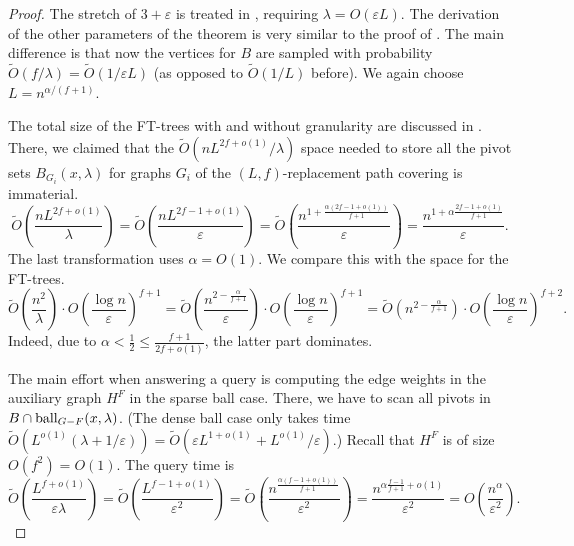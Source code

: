 \documentclass{article}\usepackage[a4paper,margin=20mm]{geometry}
\newcommand*{\Otilde}{\widetilde{O}}
\newcommand*{\ball}{\mbox{\rm ball}}
\renewcommand{\le}{\leqslant}
\begin{document}
\begin{proof}
	The stretch of $3+\varepsilon$ is treated in ,
	requiring $\lambda = O(\varepsilon L)$.
	The derivation of the other parameters of the theorem is very similar to the proof of .
	The main difference is that now the vertices for $B$ are sampled with probability
	$\Otilde(f/\lambda) = \Otilde(1/\varepsilon L)$ (as opposed to $\Otilde(1/L)$ before).
	We again choose $L = n^{\alpha/(f+1)}$.
	
	The total size of the FT-trees with and without granularity
	are discussed in .
	There, we claimed that the $\Otilde(nL^{2f+o(1)}/\lambda)$ space needed
	to store all the pivot sets $B_{G_i}(x,\lambda)$ 
	for graphs $G_i$ of the $(L,f)$-replacement path covering is immaterial.
	\begin{equation*}
		\Otilde\!\left(\frac{nL^{2f+o(1)}}{\lambda}\right) 
			= \Otilde\!\left(\frac{nL^{2f-1+o(1)}}{\varepsilon}\right)
			= \Otilde\left(\frac{n^{1+ \frac{\alpha(2f-1+o(1))}{f+1}}}{\varepsilon}\right)
			= \frac{n^{1+\alpha\frac{2f-1+o(1)}{f+1}}}{\varepsilon}.
	\end{equation*}
	The last transformation uses $\alpha = O(1)$.
	We compare this with the space for the FT-trees.
	\begin{equation*}
		\Otilde\!\left(\frac{n^2}{\lambda}\right) \cdot O\!\left(\frac{\log n}{\varepsilon}\right)^{f+1}
			= \Otilde\!\left(\frac{n^{2-\frac{\alpha}{f+1}}}{\varepsilon}\right) \cdot O\!\left(\frac{\log n}{\varepsilon}\right)^{f+1}
			= \Otilde(n^{2-\frac{\alpha}{f+1}}) \cdot O\!\left(\frac{\log n}{\varepsilon}\right)^{f+2}.
	\end{equation*}
	Indeed, due to $\alpha < \frac{1}{2} \le \frac{f+1}{2f+o(1)}$,
	the latter part dominates.
	
	The main effort when answering a query is computing the edge weights in the auxiliary graph $H^F$
	in the sparse ball case.
	There, we have to scan all pivots in $B \cap \ball_{G-F}(x,\lambda)$.
	(The dense ball case only takes time 
	$\Otilde(L^{o(1)}(\lambda + 1/\varepsilon)) 
		= \Otilde(\varepsilon L^{1+o(1)} + L^{o(1)}/\varepsilon)$.)
	Recall that $H^F$ is of size $O(f^2) = O(1)$.
	The query time is
	\begin{equation*}
		\Otilde\!\left(\frac{L^{f+o(1)}}{\varepsilon \lambda}\right)
			= \Otilde\!\left(\frac{L^{f-1+o(1)}}{\varepsilon^2}\right)
			= \Otilde\!\left(\frac{n^{\frac{\alpha(f-1+o(1))}{f+1}}}{\varepsilon^2}\right)
			= \frac{n^{\alpha\frac{f-1}{f+1}+o(1)}}{\varepsilon^2} 
			= O\!\left(\frac{n^\alpha}{\varepsilon^2}\right).
	\end{equation*}


\end{proof}
\end{document}
